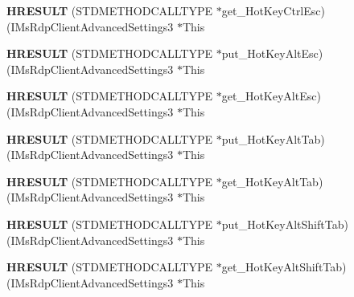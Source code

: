 \begin{DoxyCompactItemize}
{\bfseries H\+R\+E\+S\+U\+LT} (S\+T\+D\+M\+E\+T\+H\+O\+D\+C\+A\+L\+L\+T\+Y\+PE $\ast$get\+\_\+\+Hot\+Key\+Ctrl\+Esc)(I\+Ms\+Rdp\+Client\+Advanced\+Settings3 $\ast$This
\item 
\mbox{\label{struct_i_ms_rdp_client_advanced_settings3_vtbl_ace9a11d9f065003c7fd9989220e429b8}} 
{\bfseries H\+R\+E\+S\+U\+LT} (S\+T\+D\+M\+E\+T\+H\+O\+D\+C\+A\+L\+L\+T\+Y\+PE $\ast$put\+\_\+\+Hot\+Key\+Alt\+Esc)(I\+Ms\+Rdp\+Client\+Advanced\+Settings3 $\ast$This
\item 
\mbox{\label{struct_i_ms_rdp_client_advanced_settings3_vtbl_a1c3870372381cedb9b5e8b07af81465b}} 
{\bfseries H\+R\+E\+S\+U\+LT} (S\+T\+D\+M\+E\+T\+H\+O\+D\+C\+A\+L\+L\+T\+Y\+PE $\ast$get\+\_\+\+Hot\+Key\+Alt\+Esc)(I\+Ms\+Rdp\+Client\+Advanced\+Settings3 $\ast$This
\item 
\mbox{\label{struct_i_ms_rdp_client_advanced_settings3_vtbl_a80b2598b6e49f0439a8d72ba66d2c941}} 
{\bfseries H\+R\+E\+S\+U\+LT} (S\+T\+D\+M\+E\+T\+H\+O\+D\+C\+A\+L\+L\+T\+Y\+PE $\ast$put\+\_\+\+Hot\+Key\+Alt\+Tab)(I\+Ms\+Rdp\+Client\+Advanced\+Settings3 $\ast$This
\item 
\mbox{\label{struct_i_ms_rdp_client_advanced_settings3_vtbl_a85fcfd1949f7ae652529ddcc2b773532}} 
{\bfseries H\+R\+E\+S\+U\+LT} (S\+T\+D\+M\+E\+T\+H\+O\+D\+C\+A\+L\+L\+T\+Y\+PE $\ast$get\+\_\+\+Hot\+Key\+Alt\+Tab)(I\+Ms\+Rdp\+Client\+Advanced\+Settings3 $\ast$This
\item 
\mbox{\label{struct_i_ms_rdp_client_advanced_settings3_vtbl_a27d95ab771aadda4d02402f15ed3c354}} 
{\bfseries H\+R\+E\+S\+U\+LT} (S\+T\+D\+M\+E\+T\+H\+O\+D\+C\+A\+L\+L\+T\+Y\+PE $\ast$put\+\_\+\+Hot\+Key\+Alt\+Shift\+Tab)(I\+Ms\+Rdp\+Client\+Advanced\+Settings3 $\ast$This
\item 
\mbox{\label{struct_i_ms_rdp_client_advanced_settings3_vtbl_ab40937f33cd818b1dcabbdf06cd8e351}} 
{\bfseries H\+R\+E\+S\+U\+LT} (S\+T\+D\+M\+E\+T\+H\+O\+D\+C\+A\+L\+L\+T\+Y\+PE $\ast$get\+\_\+\+Hot\+Key\+Alt\+Shift\+Tab)(I\+Ms\+Rdp\+Client\+Advanced\+Settings3 $\ast$This

\end{DoxyCompactItemize}
